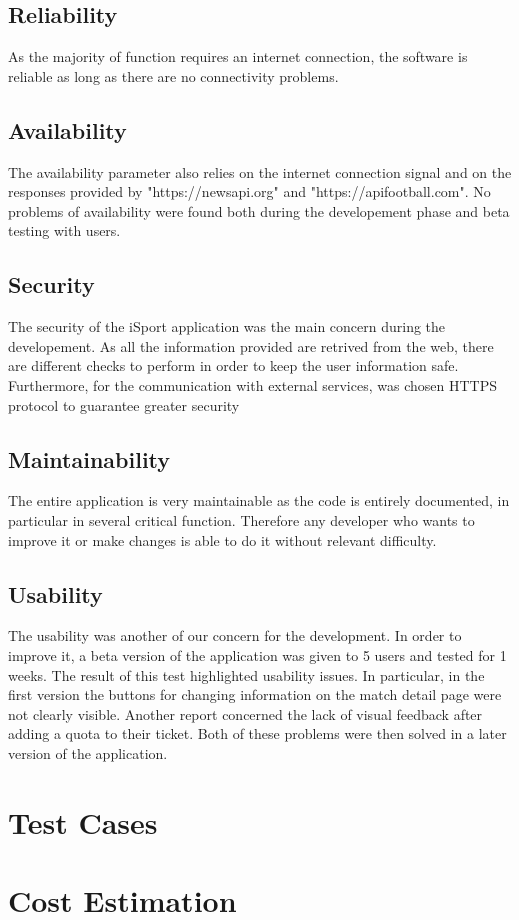 \documentclass[numbers=noenddot, 12pt, a4paper, oneside]{scrbook}
\begin{document}
\section{Reliability}
As the majority of function requires an internet connection, the software is reliable as long as there are no connectivity problems.
\section{Availability}
The availability parameter also relies on the internet connection signal and on the responses provided by "https://newsapi.org" and "https://apifootball.com". No problems of availability were found both during the developement phase and beta testing with users.
\section{Security}
The security of the iSport application was the main concern during the developement. As all the information provided are retrived from the web, there are different checks to perform in order to keep the user information safe. Furthermore, for the communication with external services, was chosen HTTPS protocol to guarantee greater security
\section{Maintainability}
The entire application is very maintainable as the code is entirely documented, in particular in several critical function. Therefore any developer who wants to improve it or make changes is able to do it without relevant difficulty.
\section{Usability}
The usability was another of our concern for the development. In order to improve it, a beta version of the application was given to 5 users and tested for 1 weeks. The result of this test highlighted usability issues. In particular, in the first version the buttons for changing information on the match detail page were not clearly visible. Another report concerned the lack of visual feedback after adding a quota to their ticket. Both of these problems were then solved in a later version of the application.

\chapter{Test Cases}
\chapter{Cost Estimation}
\end{document}
